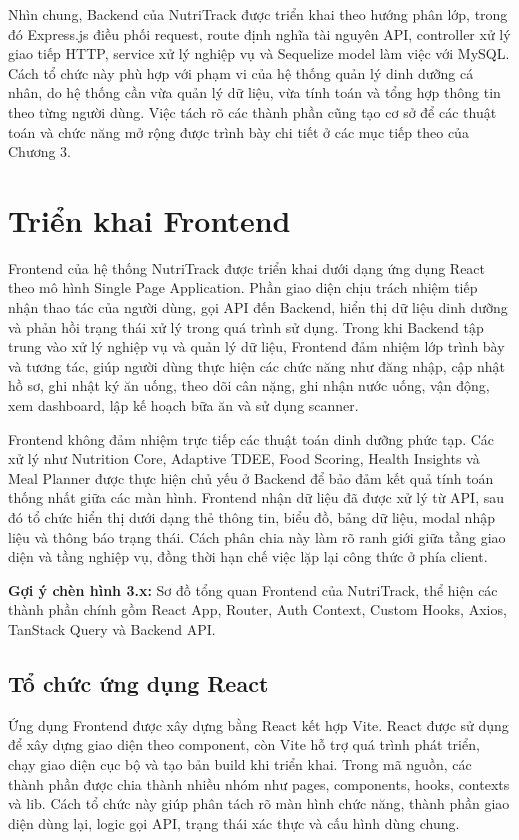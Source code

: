 \documentclass[12pt, a4paper]{report}
\begin{document}
Nhìn chung, Backend của NutriTrack được triển khai theo hướng phân lớp, trong đó Express.js điều phối request, route định nghĩa tài nguyên API, controller xử lý giao tiếp HTTP, service xử lý nghiệp vụ và Sequelize model làm việc với MySQL. Cách tổ chức này phù hợp với phạm vi của hệ thống quản lý dinh dưỡng cá nhân, do hệ thống cần vừa quản lý dữ liệu, vừa tính toán và tổng hợp thông tin theo từng người dùng. Việc tách rõ các thành phần cũng tạo cơ sở để các thuật toán và chức năng mở rộng được trình bày chi tiết ở các mục tiếp theo của Chương 3.

\section{Triển khai Frontend}Frontend của hệ thống NutriTrack được triển khai dưới dạng ứng dụng React theo mô hình Single Page Application. Phần giao diện chịu trách nhiệm tiếp nhận thao tác của người dùng, gọi API đến Backend, hiển thị dữ liệu dinh dưỡng và phản hồi trạng thái xử lý trong quá trình sử dụng. Trong khi Backend tập trung vào xử lý nghiệp vụ và quản lý dữ liệu, Frontend đảm nhiệm lớp trình bày và tương tác, giúp người dùng thực hiện các chức năng như đăng nhập, cập nhật hồ sơ, ghi nhật ký ăn uống, theo dõi cân nặng, ghi nhận nước uống, vận động, xem dashboard, lập kế hoạch bữa ăn và sử dụng scanner.

Frontend không đảm nhiệm trực tiếp các thuật toán dinh dưỡng phức tạp. Các xử lý như Nutrition Core, Adaptive TDEE, Food Scoring, Health Insights và Meal Planner được thực hiện chủ yếu ở Backend để bảo đảm kết quả tính toán thống nhất giữa các màn hình. Frontend nhận dữ liệu đã được xử lý từ API, sau đó tổ chức hiển thị dưới dạng thẻ thông tin, biểu đồ, bảng dữ liệu, modal nhập liệu và thông báo trạng thái. Cách phân chia này làm rõ ranh giới giữa tầng giao diện và tầng nghiệp vụ, đồng thời hạn chế việc lặp lại công thức ở phía client.

\textbf{Gợi ý chèn hình 3.x:} Sơ đồ tổng quan Frontend của NutriTrack, thể hiện các thành phần chính gồm React App, Router, Auth Context, Custom Hooks, Axios, TanStack Query và Backend API.

\subsection{Tổ chức ứng dụng React}Ứng dụng Frontend được xây dựng bằng React kết hợp Vite. React được sử dụng để xây dựng giao diện theo component, còn Vite hỗ trợ quá trình phát triển, chạy giao diện cục bộ và tạo bản build khi triển khai. Trong mã nguồn, các thành phần được chia thành nhiều nhóm như pages, components, hooks, contexts và lib. Cách tổ chức này giúp phân tách rõ màn hình chức năng, thành phần giao diện dùng lại, logic gọi API, trạng thái xác thực và cấu hình dùng chung.
\end{document}
